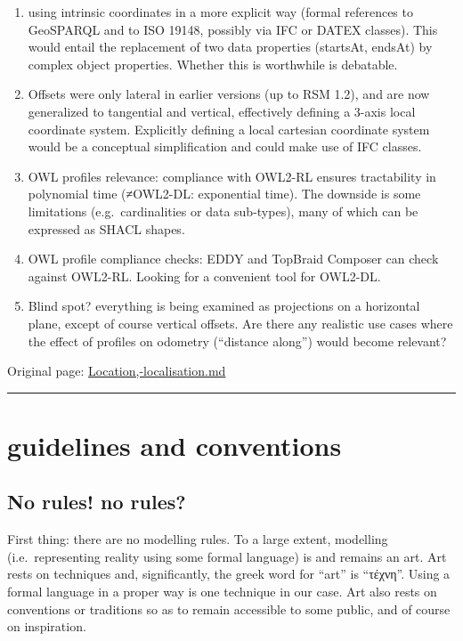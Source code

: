 \documentclass[
  11pt,
]{article}
\begin{document}
\begin{enumerate}
\def\labelenumi{\arabic{enumi}.}
\item
  using intrinsic coordinates in a more explicit way (formal references
  to GeoSPARQL and to ISO 19148, possibly via IFC or DATEX classes).
  This would entail the replacement of two data properties (startsAt,
  endsAt) by complex object properties. Whether this is worthwhile is
  debatable.
\item
  Offsets were only lateral in earlier versions (up to RSM 1.2), and are
  now generalized to tangential and vertical, effectively defining a
  3-axis local coordinate system. Explicitly defining a local cartesian
  coordinate system would be a conceptual simplification and could make
  use of IFC classes.
\item
  OWL profiles relevance: compliance with OWL2-RL ensures tractability
  in polynomial time (≠OWL2-DL: exponential time). The downside is some
  limitations (e.g.~cardinalities or data sub-types), many of which can
  be expressed as SHACL shapes.
\item
  OWL profile compliance checks: EDDY and TopBraid Composer can check
  against OWL2-RL. Looking for a convenient tool for OWL2-DL.
\item
  Blind spot? everything is being examined as projections on a
  horizontal plane, except of course vertical offsets. Are there any
  realistic use cases where the effect of profiles on odometry
  (``distance along'') would become relevant?
\end{enumerate}

Original page:
\href{https://github.com/UICrail/CDM-RSM/wiki/Location\%2C-localisation}{Location,-localisation.md}

\begin{center}\rule{0.5\linewidth}{0.5pt}\end{center}

\hypertarget{guidelines-and-conventions}{%
\section{guidelines and conventions}\label{guidelines-and-conventions}}

\hypertarget{no-rules-no-rules}{%
\subsection{No rules! no rules?}\label{no-rules-no-rules}}

First thing: there are no modelling rules. To a large extent, modelling
(i.e.~representing reality using some formal language) is and remains an
art. Art rests on techniques and, significantly, the greek word for
``art'' is ``τέχνη''. Using a formal language in a proper way is one
technique in our case. Art also rests on conventions or traditions so as
to remain accessible to some public, and of course on inspiration.
\end{document}
